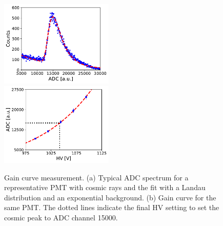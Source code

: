 \documentclass[3p,twocolumn]{elsarticle}
\begin{document}
\begin{figure}[th!]
			\includegraphics[width=0.48\textwidth]{fig15a-adcfit.pdf}\\
					\subcaption{}
                  			\label{fig:adc-spectrum}
			\includegraphics[width=0.48\textwidth]{fig15b-gaincurve.pdf}
			\subcaption{}
		\label{fig:gain-curve}
		\caption{Gain curve measurement. (a) Typical ADC spectrum for a representative PMT with cosmic rays
                  and the fit with a Landau distribution and an exponential background. (b) Gain curve for the same
                  PMT. The dotted lines indicate the final HV setting to set the cosmic peak to ADC channel 15000. }

\end{figure}
\end{document}

